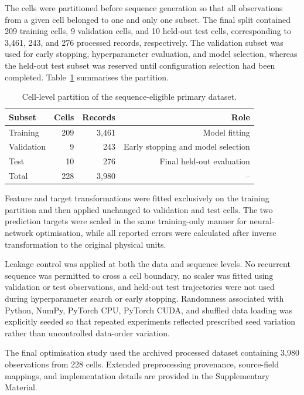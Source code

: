 \documentclass[a4paper,fleqn]{cas-sc}
\begin{document}
The cells were partitioned before sequence generation so that all observations from a given cell belonged to one and only one subset. The final split contained 209 training cells, 9 validation cells, and 10 held-out test cells, corresponding to 3,461, 243, and 276 processed records, respectively. The validation subset was used for early stopping, hyperparameter evaluation, and model selection, whereas the held-out test subset was reserved until configuration selection had been completed. Table~\ref{tab:data_split} summarises the partition.

\begin{table}[htbp]
\centering
\caption{Cell-level partition of the sequence-eligible primary dataset.}
\label{tab:data_split}
\begin{tabular}{lrrr}
\toprule
\textbf{Subset} & \textbf{Cells} & \textbf{Records} & \textbf{Role} \\
\midrule
Training & 209 & 3,461 & Model fitting \\
Validation & 9 & 243 & Early stopping and model selection \\
Test & 10 & 276 & Final held-out evaluation \\
\midrule
Total & 228 & 3,980 & -- \\
\bottomrule
\end{tabular}
\end{table}

Feature and target transformations were fitted exclusively on the training partition and then applied unchanged to validation and test cells. The two prediction targets were scaled in the same training-only manner for neural-network optimisation, while all reported errors were calculated after inverse transformation to the original physical units.

Leakage control was applied at both the data and sequence levels. No recurrent sequence was permitted to cross a cell boundary, no scaler was fitted using validation or test observations, and held-out test trajectories were not used during hyperparameter search or early stopping. Randomness associated with Python, NumPy, PyTorch CPU, PyTorch CUDA, and shuffled data loading was explicitly seeded so that repeated experiments reflected prescribed seed variation rather than uncontrolled data-order variation.

The final optimisation study used the archived processed dataset containing
3,980 observations from 228 cells. Extended preprocessing provenance,
source-field mappings, and implementation details are provided in the
Supplementary Material.
\end{document}
